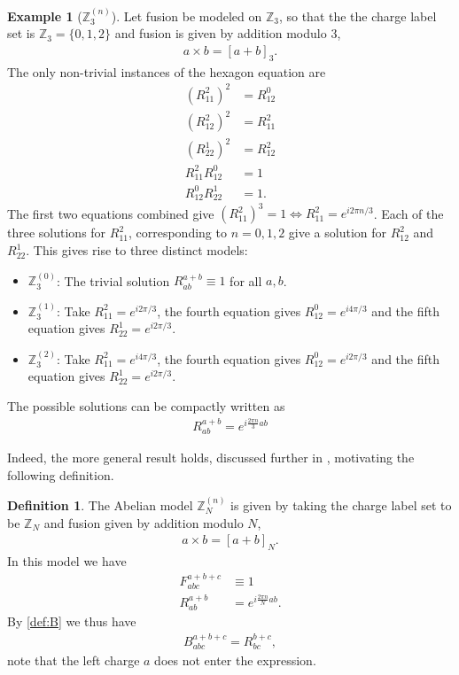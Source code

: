 \documentclass[a4paper,10pt,oneside]{book}
\theoremstyle{plain}
\theoremstyle{definition}
\newtheorem{definition}{Definition}[section]
\newtheorem{example}{Example}[section]
\theoremstyle{remark}
\begin{document}
\begin{example}[$\mathbb{Z}_3^{(n)}$]
  Let fusion be modeled on $\mathbb{Z}_3$, so that the the charge label set is $\mathbb{Z}_3 = \{0, 1, 2\}$ and fusion is given by addition modulo 3,
  \begin{align*}
    a \times b = [a + b]_3.
  \end{align*}
  The only non-trivial instances of the hexagon equation are
  \begin{align*}
    \left( R_{11}^2 \right)^2 &= R_{12}^0 \\
    \left( R_{12}^2 \right)^2 &= R_{11}^2 \\
    \left( R_{22}^1 \right)^2 &= R_{12}^2 \\
    R_{11}^2 R_{12}^0 &= 1 \\
    R_{12}^0 R_{22}^1 &= 1.
  \end{align*}
  The first two equations combined give $\left( R_{11}^2 \right)^3 = 1 \iff R_{11}^2 = e^{i2πn/3}$. Each of the three solutions for $R_{11}^2$, corresponding to $n = 0, 1, 2$ give a solution for $R_{12}^2$ and $R_{22}^1$. This gives rise to three distinct models:
  \begin{itemize}
    \item $\mathbb{Z}_3^{(0)}$: The trivial solution $R_{ab}^{a+b} \equiv 1$ for all $a, b$.
    \item $\mathbb{Z}_3^{(1)}$: Take $R_{11}^2 = e^{i2π/3}$, the fourth equation gives $R_{12}^0 = e^{i4π/3}$ and the fifth equation gives $R_{22}^1 = e^{i2π/3}$.
    \item $\mathbb{Z}_3^{(2)}$: Take $R_{11}^2 = e^{i4π/3}$, the fourth equation gives $R_{12}^0 = e^{i2π/3}$ and the fifth equation gives $R_{22}^1 = e^{i2π/3}$.
  \end{itemize}
  The possible solutions can be compactly written as
  \begin{align*}
    R_{ab}^{a+b} = e^{i\frac{2πn}{3}ab}
  \end{align*}
\end{example}

Indeed, the more general result holds, discussed further in \cite{bonderson}, motivating the following definition.

\begin{definition}
  The Abelian model $\mathbb{Z}_N^{(n)}$ is given by taking the charge label set to be $\mathbb{Z}_N$ and fusion given by addition modulo $N$,
  \begin{align*}
    a \times b = [a + b]_N.
  \end{align*}
  In this model we have
  \begin{align}
    \label{eq:abelian F}
    F_{abc}^{a+b+c} &\equiv 1 \\
    \label{eq:abelian R}
    R_{ab}^{a+b} &= e^{i\frac{2πn}{N}ab}.
  \end{align}
  By \cref{def:B} we thus have
  \begin{align}\label{eq:abelian B}
    B_{abc}^{a+b+c} = R_{bc}^{b+c},
  \end{align}
  note that the left charge $a$ does not enter the expression.
\end{definition}
\end{document}
